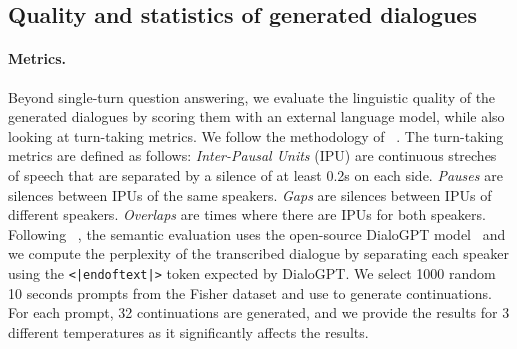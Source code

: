 \begin{table}[t]
    \centering
    \caption{\textbf{Linguistic quality and turn-taking statistics of generated dialogues}. As we train our multi-stream model to generate both sides of the conversation, we can generate dialogues without the need to interact with a real user. This allows evaluating how much \ours{} learns natural conversational dynamics.}
    \label{tab:multistream}
\end{table}

\subsection{Quality and statistics of generated dialogues}
\label{sec:eval_dialogues}
\paragraph{Metrics.}
Beyond single-turn question answering, we evaluate the linguistic quality of the generated dialogues by scoring them with an external language model, while also looking at turn-taking metrics. We follow the methodology of ~\citet{nguyen-etal-2023-generative}. The turn-taking metrics are defined as follows: \emph{Inter-Pausal Units} (IPU) are continuous streches of speech that are separated by a silence of at least 0.2s on each side.
\emph{Pauses} are silences between IPUs of the same speakers.
\emph{Gaps} are silences between IPUs of different speakers.
\emph{Overlaps} are times where there are IPUs for both speakers. Following ~\citet{nguyen-etal-2023-generative}, the semantic evaluation uses the open-source DialoGPT model~\cite{dialogpt} and we compute the perplexity of the transcribed dialogue by separating each speaker using the \texttt{<|endoftext|>} token expected by DialoGPT.
We select 1000 random 10 seconds prompts from the Fisher dataset and use \ours{} to generate continuations. For each prompt, 32 continuations are generated, and we provide the
results for 3 different temperatures as it significantly affects the results.

